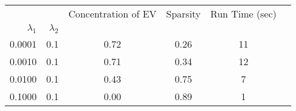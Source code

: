 \begin{tabular}{rr|cccc}
\toprule
       &     &  Concentration of EV &  Sparsity & Run Time (sec) \\
$\lambda_1$ & $\lambda_2$ &                      &           &                \\
\midrule
0.0001 & 0.1 &                 0.72 &      0.26 &             11 \\
0.0010 & 0.1 &                 0.71 &      0.34 &             12 \\
0.0100 & 0.1 &                 0.43 &      0.75 &              7 \\
0.1000 & 0.1 &                 0.00 &      0.89 &              1 \\
\bottomrule
\end{tabular}

